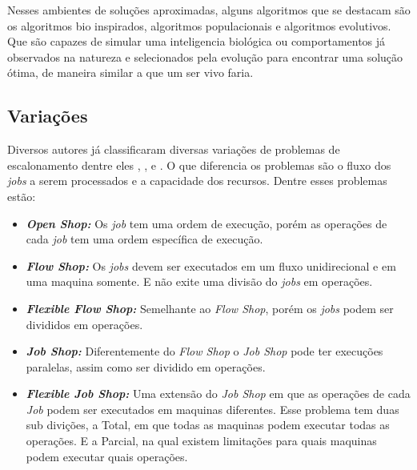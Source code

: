         Nesses ambientes de soluções aproximadas, alguns algoritmos que se destacam são os algoritmos bio inspirados, algoritmos populacionais e algoritmos evolutivos. Que são capazes de simular uma inteligencia biológica ou comportamentos já observados na natureza e selecionados pela evolução para encontrar uma solução ótima, de maneira similar a que um ser vivo faria.


    \subsection{Variações}
        Diversos autores já classificaram diversas variações de problemas de escalonamento dentre eles \cite{graham1979}, \cite{Lenstra1979}, e \cite{maccarthy1993}. O que diferencia os problemas são o fluxo dos \textit{jobs} a serem processados e a capacidade dos recursos. Dentre esses problemas estão:
        \begin{itemize}
            \item \textbf{\textit{Open Shop:}} Os \textit{job} tem uma ordem de execução, porém as operações de cada \textit{job} tem uma ordem específica de execução.
            
            \item \textbf{\textit{Flow Shop:}} Os \textit{jobs} devem ser executados em um fluxo unidirecional e em uma maquina somente. E não exite uma divisão do \textit{jobs} em operações.
            
            \item \textbf{\textit{Flexible Flow Shop:}} Semelhante ao \textit{Flow Shop}, porém os \textit{jobs} podem ser divididos em operações.
            
            \item \textbf{\textit{Job Shop:}} Diferentemente do \textit{Flow Shop} o \textit{Job Shop} pode ter execuções paralelas, assim como ser dividido em operações.
            
            \item \textbf{\textit{Flexible Job Shop:}} Uma extensão do \textit{Job Shop} em que as operações de cada \textit{Job} podem ser executados em maquinas diferentes. Esse problema tem duas sub divições, a Total, em que todas as maquinas podem executar todas as operações. E a Parcial, na qual existem limitações para quais maquinas podem executar quais operações.
        \end{itemize}

